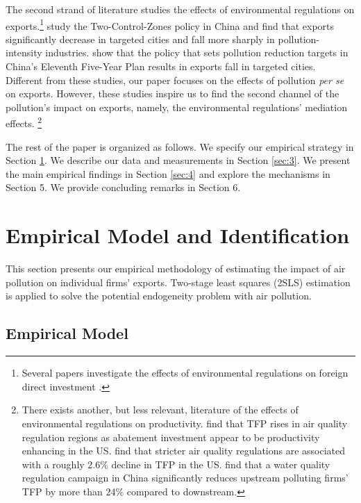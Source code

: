 \documentclass[12pt]{article}
\begin{document}
The second strand of literature studies the effects of environmental regulations on
exports.\footnote{%
Several papers investigate the effects of environmental regulations on
foreign direct investment \citep{dean2009foreign,cai2016does}.} \cite%
{hering2014environmental} study the Two-Control-Zones policy in China and
find that exports significantly decrease in targeted cities and fall more
sharply in pollution-intensity industries. \cite{shi2018environmental} show
that the policy that sets pollution reduction targets in China's Eleventh
Five-Year Plan results in exports fall in targeted cities. Different from
these studies, our paper focuses on the effects of pollution \textit{per se}
on exports. However, these studies inspire us to find the second channel of
the pollution's impact on exports, namely, the environmental regulations' mediation effects.%
\footnote{%
There exists another, but less relevant, literature of the effects of
environmental regulations on productivity. \cite{berman2001environmental}
find that TFP rises in air quality regulation regions as abatement
investment appear to be productivity enhancing in the US. \cite{NBERw18392}
find that stricter air quality regulations are associated with a roughly
2.6\% decline in TFP in the US. \cite{he2020watering} find that a water
quality regulation campaign in China significantly reduces upstream
polluting firms' TFP by more than 24\% compared to downstream.}

The rest of the paper is organized as follows. We specify our empirical
strategy in Section \ref{sec:empirical_strategy}. We describe our data and measurements in Section \ref{sec:3}.
We present the main empirical findings in Section \ref{sec:4} and explore the
mechanisms in Section 5. We provide concluding remarks in Section 6.

\section{Empirical Model and Identification}

\label{sec:empirical_strategy} This section presents our empirical
methodology of estimating the impact of air pollution on individual firms'
exports. Two-stage
least squares (2SLS)
estimation is applied to solve the potential endogeneity problem with
air pollution.

\subsection{Empirical Model}
\end{document}
